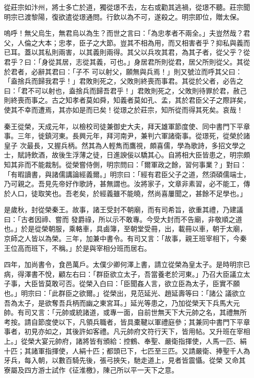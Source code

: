 \begin{pinyinscope}
 從莊宗如汴州，將士多亡於道，獨從璟不去，左右或勸其逃禍，從璟不聽。莊宗聞明宗已渡黎陽，復欲遣從璟通問。行欽以為不可，遂殺之。明宗即位，贈太保。



 嗚呼！無父烏生，無君烏以為生？而世之言曰：「為忠孝者不兩全。」夫豈然哉？君父，人倫之大本；忠孝，臣子之大節。豈其不相為用，而又相害者乎？抑私與義而已耳。蓋以其私則兩害，以其義則兩得。其父以兵攻其君，為其子者，從父乎？從君乎？曰：「身從其居，志從其義，可也。」身居君所則從君，居父所則從父。其從於君者，必辭其君曰：「子不
 可以射父，願無與兵焉！」則又號泣而呼其父曰：「盍捨兵而歸我君乎！」君敗則死之，父敗則終喪而事君。其從於父者，必告之曰：「君不可以射也，盍捨兵而歸吾君乎！」君敗則死之，父敗則待罪於君，赦己則終喪而事之。古之知孝者莫如舜，知義者莫如孔、孟，其於君臣父子之際詳矣，使其不幸而遭焉，其亦如是而已矣！從璟之於莊宗，知所從而得其死矣。哀哉！



 秦王從榮，天成元年，以檢校司徒兼御史大夫，拜天雄軍節度使、同中書門下平章事。三年，徙鎮河東。長興元年，拜河南尹，兼判六軍諸衛事。從璟死，從榮於諸皇子
 次最長，又握兵柄。然其為人輕雋而鷹視，頗喜儒，學為歌詩，多招文學之士，賦詩飲酒，故後生浮薄之徒，日進諛佞以驕其心。自將相大臣皆患之，明宗頗知其非而不能裁制。從榮嘗侍側，明宗問曰：「爾軍政之餘，習何事業？」對曰：「有暇讀書，與諸儒講論經義爾。」明宗曰：「經有君臣父子之道，然須碩儒端士，乃可親之。吾見先帝好作歌詩，甚無謂也。汝將家子，文章非素習，必不能工，傳於人口，徒取笑也。吾老矣，於經義雖不能曉，然尚喜屢聞之，甚餘不足學也。」



 是歲秋，封從榮秦王。故事，諸王受封不朝廟，而有司希旨，欲重其禮，乃建議曰：「古者因禘、嘗而
 發爵祿，所以示不敢專。今受大封而不告廟，非敬順之道也。」於是從榮朝服，乘輅車，具鹵簿，至朝堂受冊，出，載冊以車，朝于太廟，京師之人皆以為榮。三年，加兼中書令。有司又言：「故事，親王班宰相下，今秦王位高而班下，不稱。」於是與宰相分班而居右。



 四年，加尚書令，食邑萬戶。太僕少卿何澤上書，請立從榮為皇太子。是時明宗已病，得澤書不悅，顧左右曰：「群臣欲立太子，吾當養老於河東。」乃召大臣議立太子事，大臣皆莫敢可否。從榮入白曰：「臣聞姦人言，欲立臣為太子，臣實不願也。」明宗曰：「此群臣之欲爾。」從榮出，見范延光、趙延壽等曰：「諸公
 議欲立吾為太子，是欲奪吾兵柄而幽之東宮耳。」延光等患之，乃加從榮天下兵馬大元帥。有司又言：「元帥或統諸道，或專一面，自前世無天下大元帥之名，其禮無所考按。請自節度使以下，凡領兵職者，皆具橐鞬以軍禮庭參；其兼同中書門下平章事者，初見亦如之，其後許如客禮。凡元帥府文符行天下，皆用帖。又升班在宰相上。」從榮大宴元帥府，諸將皆有頒給：控鶴、奉聖、嚴衛指揮使，人馬一匹、絹十匹；其諸軍指揮使，人絹十匹；都頭已下，七匹至三匹。又請嚴衛、捧聖千人為牙兵，每入朝，以數百騎先後，張弓挾矢，馳走道上，見者皆震懾。從榮
 又命其寮屬及四方游士試作《征淮檄》，陳己所以平一天下之意。




\end{pinyinscope}
